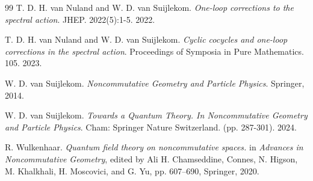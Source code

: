 \documentclass[11pt]{article}
\theoremstyle{plain}
\begin{document}
\begin{thebibliography}{99}
T. D. H. van Nuland  and W. D. van Suijlekom. \emph{One-loop corrections to the spectral action}. JHEP. 2022(5):1-5. 2022.

T. D. H. van Nuland  and W. D. van Suijlekom. \emph{Cyclic cocycles and one-loop corrections in the spectral action}. Proceedings of Symposia in Pure Mathematics. 105. 2023.



W. D. van Suijlekom. \emph{Noncommutative Geometry and Particle Physics}. Springer, 2014.

W. D. van Suijlekom. \emph{Towards a Quantum Theory. In Noncommutative Geometry and Particle Physics}. Cham: Springer Nature Switzerland. (pp. 287-301). 2024.

 R.  Wulkenhaar.  {\it Quantum field theory on noncommutative spaces.} in \textit{Advances in Noncommutative Geometry}, edited by Ali H. Chamseddine, Connes, N. Higson, M. Khalkhali, H. Moscovici, and G. Yu, pp. 607--690, Springer, 2020.



\end{thebibliography}
\end{document}
